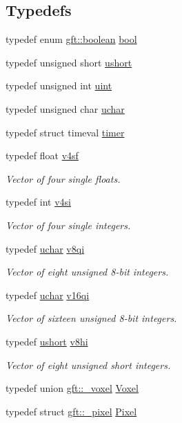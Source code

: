\subsection*{Typedefs}
\begin{DoxyCompactItemize}
\item 
typedef enum \hyperlink{namespacegft_a46216ea11b673fe8800c5666be2e5cc1}{gft\-::boolean} \hyperlink{namespacegft_a033dba4822661600b08d2bbf16879252}{bool}
\item 
typedef unsigned short \hyperlink{namespacegft_a878518cf75338c097e2c8e9b10bfb00d}{ushort}
\item 
typedef unsigned int \hyperlink{namespacegft_a4582b4dfe448021d46b76a75fb47799b}{uint}
\item 
typedef unsigned char \hyperlink{namespacegft_a6411e297d5ac5aa9b91a37da00952197}{uchar}
\item 
typedef struct timeval \hyperlink{namespacegft_af9c336df27e94c088477837089de57cf}{timer}
\item 
typedef float \hyperlink{namespacegft_aefb7835e45e071d47ff9320a4015ad8f}{v4sf}
\begin{DoxyCompactList}\small\item\em Vector of four single floats. \end{DoxyCompactList}\item 
typedef int \hyperlink{namespacegft_aba3889d81ba015326f093206316745b7}{v4si}
\begin{DoxyCompactList}\small\item\em Vector of four single integers. \end{DoxyCompactList}\item 
typedef \hyperlink{namespacegft_a6411e297d5ac5aa9b91a37da00952197}{uchar} \hyperlink{namespacegft_a8f84989647cef28b9a4861e651c0efd1}{v8qi}
\begin{DoxyCompactList}\small\item\em Vector of eight unsigned 8-\/bit integers. \end{DoxyCompactList}\item 
typedef \hyperlink{namespacegft_a6411e297d5ac5aa9b91a37da00952197}{uchar} \hyperlink{namespacegft_a146b2cce4e032edc85e179b693dbe5f7}{v16qi}
\begin{DoxyCompactList}\small\item\em Vector of sixteen unsigned 8-\/bit integers. \end{DoxyCompactList}\item 
typedef \hyperlink{namespacegft_a878518cf75338c097e2c8e9b10bfb00d}{ushort} \hyperlink{namespacegft_ad8aa1dd830c817ab1974c6e4c1b28226}{v8hi}
\begin{DoxyCompactList}\small\item\em Vector of eight unsigned short integers. \end{DoxyCompactList}\item 
typedef union \hyperlink{uniongft_1_1__voxel}{gft\-::\-\_\-voxel} \hyperlink{namespacegft_a16db894075bb714f877a3c5733772db6}{Voxel}
\item 
typedef struct \hyperlink{structgft_1_1__pixel}{gft\-::\-\_\-pixel} \hyperlink{namespacegft_a92574f04d80bffa13cacefde2f266c14}{Pixel}
\end{DoxyCompactItemize}

